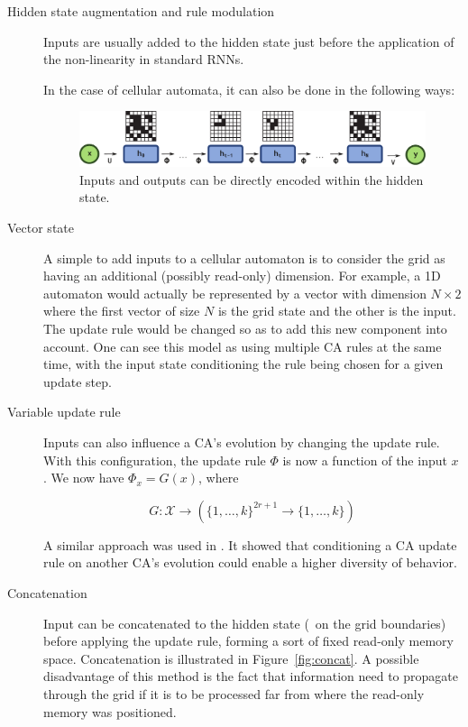 \begin{description}

\item[Hidden state augmentation and rule modulation]
Inputs are usually added to the hidden state just before the application of the
non-linearity in standard RNNs.

In the case of cellular automata, it can also be done in the following ways:

\begin{figure}[ht]
  \centering
  \includegraphics[width=.9\linewidth]{figures/encode_decode.pdf}
  \caption{\label{fig:encode_decode} Inputs and outputs can be directly
    encoded within the hidden state.}
\end{figure}

\item[Vector state] A simple to add inputs to a cellular automaton is to
consider the grid as having an additional (possibly read-only) dimension. For
example, a 1D automaton would actually be represented by a vector with dimension
$N\times 2$ where the first vector of size $N$ is the grid state and the other
is the input. The update rule would be changed so as to add this new component
into account. One can see this model as using multiple CA rules at the same
time, with the input state conditioning the rule being chosen for a given update
step.

\item[Variable update rule] Inputs can also influence a CA's evolution by
changing the update rule. With this configuration, the update rule $\Phi$ is now
a function of the input $x$. We now have $\Phi_x = G(x)$, where

\[G: \mathcal{X} \rightarrow \left({\{ 1, \ldots, k \}}^{2r+1} \to \{1, \ldots, k\}\right)\]


A similar approach was used in \parencite{adamsFormalDefinitionsUnbounded2017}. It
showed that conditioning a CA update rule on another CA's evolution could enable
a higher diversity of behavior.

\item[Concatenation] Input can be concatenated to the hidden state (\eg~on
the grid boundaries) before applying the update rule, forming a sort of fixed
read-only memory space. Concatenation is illustrated in Figure~\ref{fig:concat}.
A possible disadvantage of this method is the fact that information need to
propagate through the grid if it is to be processed far from where the read-only
memory was positioned.


\end{description}
